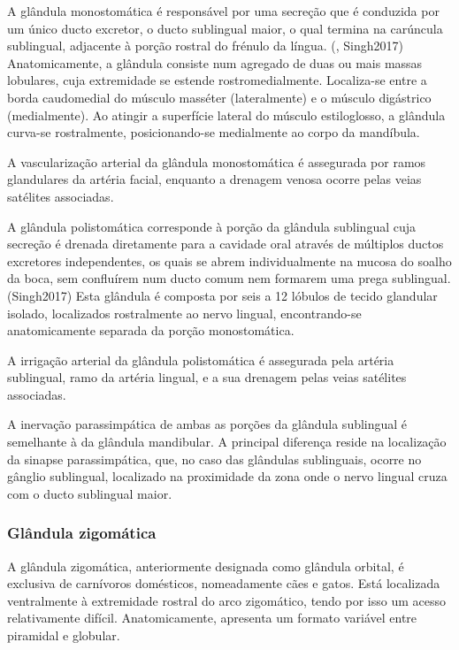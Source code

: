 A glândula monostomática é responsável por uma secreção que é conduzida por um único ducto excretor, o ducto sublingual maior, o qual termina na carúncula sublingual, adjacente à porção rostral do frénulo da língua. (\cite{evans_millers_2012}, Singh2017) Anatomicamente, a glândula consiste num agregado de duas ou mais massas lobulares, cuja extremidade se estende rostromedialmente. Localiza-se entre a borda caudomedial do músculo masséter (lateralmente) e o músculo digástrico (medialmente). Ao atingir a superfície lateral do músculo estiloglosso, a glândula curva-se rostralmente, posicionando-se medialmente ao corpo da mandíbula. \cite{evans_millers_2012}


A vascularização arterial da glândula monostomática é assegurada por ramos glandulares da artéria facial, enquanto a drenagem venosa ocorre pelas veias satélites associadas. \cite{evans_millers_2012}


A glândula polistomática corresponde à porção da glândula sublingual cuja secreção é drenada diretamente para a cavidade oral através de múltiplos ductos excretores independentes, os quais se abrem individualmente na mucosa do soalho da boca, sem confluírem num ducto comum nem formarem uma prega sublingual. (Singh2017)\cite{lobprise_oral_2019} Esta glândula é composta por seis  a 12 lóbulos de tecido glandular isolado, localizados rostralmente ao nervo lingual, encontrando-se anatomicamente separada da porção monostomática. \cite{evans_millers_2012}


A irrigação arterial da glândula polistomática é assegurada pela artéria sublingual, ramo da artéria lingual, e a sua drenagem pelas veias satélites associadas. \cite{evans_millers_2012}


A inervação parassimpática de ambas as porções da glândula sublingual é semelhante \cite{Han2016} à da glândula mandibular. A principal diferença reside na localização da sinapse parassimpática, que, no caso das glândulas sublinguais, ocorre no gânglio sublingual, localizado na proximidade da zona onde o nervo lingual cruza com o ducto sublingual maior. \cite{evans_millers_2012}

\subsubsection{Glândula zigomática}

A glândula zigomática, anteriormente designada como glândula orbital, é exclusiva de carnívoros domésticos, nomeadamente cães e gatos. Está localizada ventralmente à extremidade rostral do arco zigomático, tendo por isso um acesso relativamente difícil.\cite{lobprise_oral_2019,evans_millers_2012} 
Anatomicamente, apresenta um formato variável entre piramidal e globular. 

